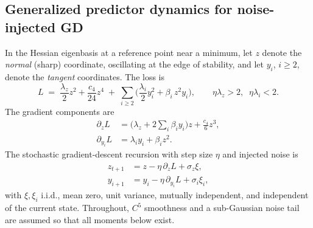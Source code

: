 \documentclass{article} %
\theoremstyle{plain}
\theoremstyle{definition}
\newcommand{\E}{\mathbb{E}}
\begin{document}
\begin{itemize}[nosep,leftmargin=*]

\section{Generalized predictor dynamics for noise-injected GD}


In the Hessian eigenbasis at a reference point near a minimum, let $z$ denote the
\emph{normal} (sharp) coordinate, oscillating at the edge of stability, and let
$y_i$, $i\ge 2$, denote the \emph{tangent} coordinates. The loss is
\begin{equation}
L \;=\; \frac{\lambda_z}{2}z^2 + \frac{c_4}{24}z^4 
\;+\; \sum_{i\ge 2}\Big( \frac{\lambda_i}{2}y_i^2 + \beta_i\, z^2 y_i \Big),
\qquad \eta\lambda_z > 2,\;\; \eta\lambda_i < 2.
\label{eq:loss}
\end{equation}
The gradient components are
\begin{align}
\partial_z L &= \Big(\lambda_z + 2\textstyle\sum_i \beta_i y_i\Big) z
 + \frac{c_4}{6}z^3, \label{eq:dzL}\\
\partial_{y_i} L &= \lambda_i y_i + \beta_i z^2. \label{eq:dyL}
\end{align}
The stochastic gradient-descent recursion with step size $\eta$ and injected noise is
\begin{align}
z_{t+1} &= z - \eta\,\partial_z L + \sigma_z\xi, \label{eq:zupdate}\\
y_{i+1} &= y_i - \eta\,\partial_{y_i}L + \sigma_i\xi_i, \label{eq:yupdate}
\end{align}
with $\xi,\xi_i$ i.i.d., mean zero, unit variance, mutually independent, and independent
of the current state. Throughout, $C^5$ smoothness and a sub-Gaussian noise tail are
assumed so that all moments below exist.



\end{itemize}
\end{document}
